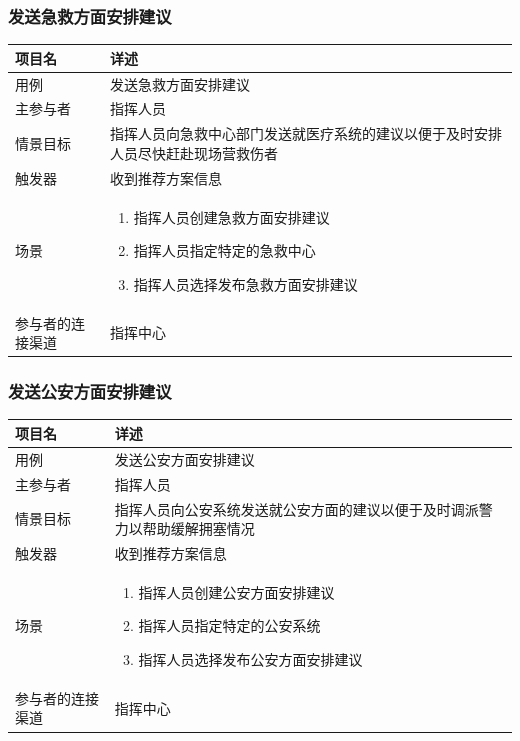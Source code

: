 \documentclass{ctexrep}
\begin{document}
\subsubsection{发送急救方面安排建议}
\begin{longtable}{p{2cm} | p{10cm}}
\hline
项目名 & 详述 \\
\hline
\hline
用例 & 发送急救方面安排建议\\
\hline
主参与者 & 指挥人员 \\
\hline
情景目标 &  指挥人员向急救中心部门发送就医疗系统的建议以便于及时安排人员尽快赶赴现场营救伤者\\
\hline
触发器 &  收到推荐方案信息\\
\hline
场景 & \begin{enumerate}
	\item 指挥人员创建急救方面安排建议
	\item 指挥人员指定特定的急救中心
	\item 指挥人员选择发布急救方面安排建议
\end{enumerate} \\
\hline
参与者的连接渠道 & 指挥中心 \\
\hline
\end{longtable}

\subsubsection{发送公安方面安排建议}
\begin{longtable}{p{2cm} | p{10cm}}
\hline
项目名 & 详述 \\
\hline
\hline
用例 & 发送公安方面安排建议\\
\hline
主参与者 & 指挥人员 \\
\hline
情景目标 &  指挥人员向公安系统发送就公安方面的建议以便于及时调派警力以帮助缓解拥塞情况\\
\hline
触发器 &  收到推荐方案信息\\
\hline
场景 & \begin{enumerate}
	\item 指挥人员创建公安方面安排建议
	\item 指挥人员指定特定的公安系统
	\item 指挥人员选择发布公安方面安排建议
\end{enumerate} \\
\hline
参与者的连接渠道 & 指挥中心 \\
\hline
\end{longtable}
\end{document}
